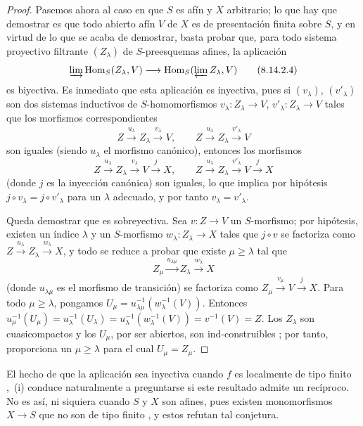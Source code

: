\begin{proof}
Pasemos ahora al caso en que $S$ es afín y $X$ arbitrario; lo que hay que demostrar es que todo abierto afín $V$ de $X$ es de presentación finita sobre $S$, y en virtud de lo que se acaba de demostrar, basta probar que, para todo sistema proyectivo filtrante $(Z_\lambda)$ de $S$-preesquemas afines, la aplicación
\begin{equation}
\label{IV.8.14.2.4-fr}
\varinjlim\operatorname{Hom}_S(Z_\lambda,V)
\longrightarrow
\operatorname{Hom}_S(\varprojlim Z_\lambda,V) \tag{8.14.2.4}
\end{equation}
es biyectiva.
Es inmediato que esta aplicación es inyectiva, pues si $(v_\lambda)$, $(v'_\lambda)$ son dos sistemas inductivos de $S$-homomorfismos $v_\lambda:Z_\lambda\to V$, $v'_\lambda:Z_\lambda\to V$ tales que los morfismos correspondientes
\[
Z\xrightarrow{u_\lambda}Z_\lambda\xrightarrow{v_\lambda}V,
\qquad
Z\xrightarrow{u_\lambda}Z_\lambda\xrightarrow{v'_\lambda}V
\]
son iguales (siendo $u_\lambda$ el morfismo canónico), entonces los morfismos
\[
Z\xrightarrow{u_\lambda}Z_\lambda\xrightarrow{v_\lambda}V
\xrightarrow{j}X,
\qquad
Z\xrightarrow{u_\lambda}Z_\lambda\xrightarrow{v'_\lambda}V
\xrightarrow{j}X
\]
(donde $j$ es la inyección canónica) son iguales, lo que implica por hipótesis $j\circ v_\lambda=j\circ v'_\lambda$ para un $\lambda$ adecuado, y por tanto $v_\lambda=v'_\lambda$.


Queda demostrar que  es sobreyectiva.
Sea $v:Z\to V$ un $S$-morfismo; por hipótesis, existen un índice $\lambda$ y un $S$-morfismo
$w_\lambda:Z_\lambda\to X$ tales que $j\circ v$ se factoriza como
$Z\xrightarrow{u_\lambda}Z_\lambda\xrightarrow{w_\lambda}X$, y todo se reduce a probar que existe $\mu\geqslant\lambda$ tal que
\[
Z_\mu\xrightarrow{u_{\lambda\mu}}Z_\lambda
\xrightarrow{w_\lambda}X
\]
(donde $u_{\lambda\mu}$ es el morfismo de transición) se factoriza como
$Z_\mu\xrightarrow{v_\mu}V\xrightarrow{j}X$.
Para todo $\mu\geqslant\lambda$, pongamos
$U_\mu=u_{\lambda\mu}^{-1}(w_\lambda^{-1}(V))$.
Entonces
$u_\mu^{-1}(U_\mu)=u_\lambda^{-1}(U_\lambda)
=u_\lambda^{-1}(w_\lambda^{-1}(V))=v^{-1}(V)=Z$.
Los $Z_\lambda$ son cuasicompactos y los $U_\mu$, por ser abiertos, son
ind-construibles ; por tanto,  proporciona un
$\mu\geqslant\lambda$ para el cual $U_\mu=Z_\mu$.
\end{proof}

\begin{remark}[8.14.3]
\label{IV.8.14.3-fr}
El hecho de que la aplicación  sea inyectiva cuando $f$ es localmente de tipo
finito ,~(i) conduce naturalmente a preguntarse si este resultado admite un recíproco.
No es así, ni siquiera cuando $S$ y $X$ son afines, pues existen monomorfismos
$X\to S$ que no son de tipo finito , y estos refutan tal
conjetura.
\end{remark}
